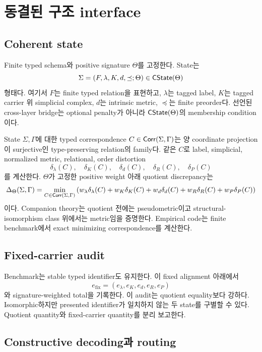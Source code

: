 \section{동결된 구조 interface}
\label{sec:interface}

\subsection{Coherent state}

Finite typed schema와 positive signature \(\Theta\)를 고정한다. State는
\[
\Sigma=(F,\lambda,K,d,\preceq;\Theta)\in\mathsf{CState}(\Theta)
\]
형태다. 여기서 \(F\)는 finite typed relation을 표현하고, \(\lambda\)는 tagged
label, \(K\)는 tagged carrier 위 simplicial complex, \(d\)는 intrinsic
metric, \(\preceq\)는 finite preorder다. 선언된 cross-layer bridge는 optional
penalty가 아니라 \(\mathsf{CState}(\Theta)\)의 membership condition이다.

State \(\Sigma,\Gamma\)에 대한 typed correspondence
\(C\in\mathsf{Corr}(\Sigma,\Gamma)\)는 양 coordinate projection이 surjective인
type-preserving relation의 family다. 같은 \(C\)로 label, simplicial,
normalized metric, relational, order distortion
\[
\delta_\lambda(C),\quad \delta_K(C),\quad \delta_d(C),\quad
\delta_R(C),\quad \delta_P(C)
\]
를 계산한다. \(\Theta\)가 고정한 positive weight 아래 quotient discrepancy는
\[
\Delta_{\Theta}(\Sigma,\Gamma)
=
\min_{C\in\mathsf{Corr}(\Sigma,\Gamma)}
\left(
w_\lambda\delta_\lambda(C)
+w_K\delta_K(C)
+w_d\delta_d(C)
+w_R\delta_R(C)
+w_P\delta_P(C)
\right)
\]
이다. Companion theory는 quotient 전에는 pseudometric이고
structural-isomorphism class 위에서는 metric임을 증명한다. Empirical code는
finite benchmark에서 exact minimizing correspondence를 계산한다.

\subsection{Fixed-carrier audit}

Benchmark는 stable typed identifier도 유지한다. 이 fixed alignment 아래에서
\[
e_{\mathrm{fix}}
=
(e_\lambda,e_K,e_d,e_R,e_P)
\]
와 signature-weighted total을 기록한다. 이 audit는 quotient equality보다
강하다. Isomorphic하지만 presented identifier가 일치하지 않는 두 state를
구별할 수 있다. Quotient quantity와 fixed-carrier quantity를 분리 보고한다.

\subsection{Constructive decoding과 routing}

